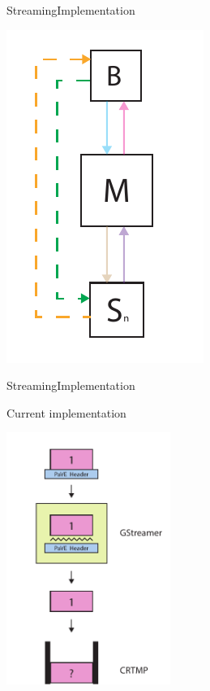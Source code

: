 \begin{frame}{Streaming}{Implementation}
  \begin{center}
    \includegraphics[height=0.7\textheight]{images/dataflow_diagram.pdf}
  \end{center}
\end{frame}

\begin{frame}{Streaming}{Implementation}
  \begin{block}{Current implementation}
    \begin{center}
      \includegraphics[width=0.4\textwidth]{images/stream_what_we_did.pdf}
    \end{center}
  \end{block}
\end{frame}

